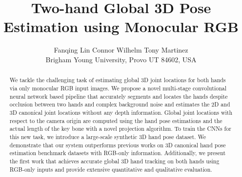 \documentclass[10pt,twocolumn,letterpaper]{article}
\begin{document}
\title{Two-hand Global 3D Pose Estimation using Monocular RGB}

\author{Fanqing Lin \qquad Connor Wilhelm \qquad Tony Martinez \\Brigham Young University, Provo UT 84602, USA} \date{}
\maketitle


\begin{abstract}
We tackle the challenging task of estimating global 3D joint locations for both hands via only monocular RGB input images. We propose a novel multi-stage convolutional neural network based pipeline that accurately segments and locates the hands despite occlusion between two hands and complex background noise and estimates the 2D and 3D canonical joint locations without any depth information. Global joint locations with respect to the camera origin are computed using the hand pose estimations and the actual length of the key bone with a novel projection algorithm. To train the CNNs for this new task, we introduce a large-scale synthetic 3D hand pose dataset. We demonstrate that our system outperforms previous works on 3D canonical hand pose estimation benchmark datasets with RGB-only information. Additionally, we present the first work that achieves accurate global 3D hand tracking on both hands using RGB-only inputs and provide extensive quantitative and qualitative evaluation.
\end{abstract}
\end{document}
